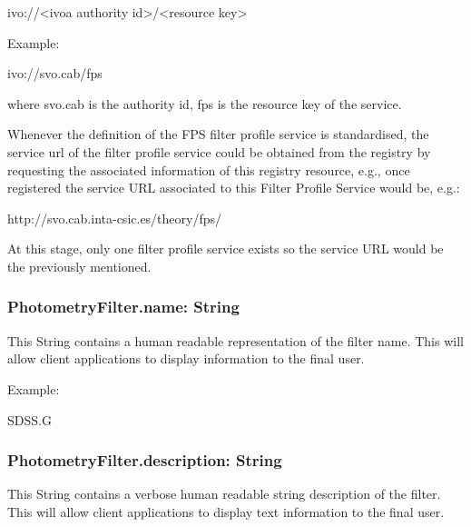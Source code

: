 \documentclass[11pt,a4paper]{ivoa}
\begin{document}
ivo://<ivoa authority id>/<resource key>
\bigskip


Example:
\par

ivo://svo.cab/fps
\bigskip




where svo.cab is the authority id, fps is the resource key of the service.
\par

Whenever the definition of the FPS filter profile service is standardised,
the service url of the filter profile service could be obtained 
from the registry by requesting the associated information of this 
registry resource, e.g., once registered the service URL associated 
to this Filter Profile Service would be, e.g.:
\par

http://svo.cab.inta-csic.es/theory/fps/
\bigskip

At this stage, only one filter profile service exists so the service
URL would be the previously mentioned.

\subsubsection{PhotometryFilter.name: String}
This String contains a human readable representation of the filter 
name. This will allow client applications to display information 
to the final user.
\par

Example:
\par

SDSS.G
\bigskip




\subsubsection{PhotometryFilter.description: String}
This String contains a verbose human readable string description of the 
filter. This will allow client applications to display text information 
to the final user.
\par
\end{document}
